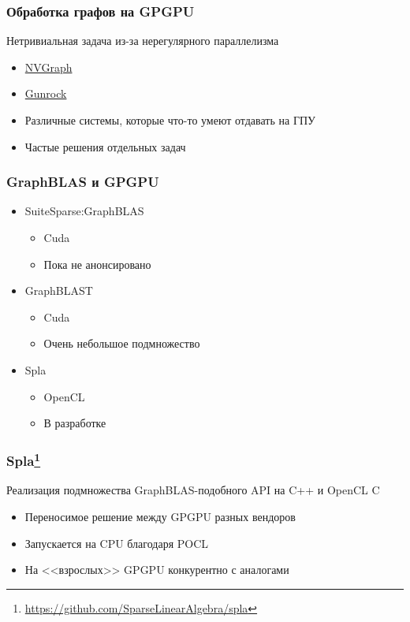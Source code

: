 \documentclass[xcolor=table,aspectratio=169]{beamer}
\begin{document}
\begin{frame}[fragile]
  \frametitle{Обработка графов на GPGPU}
  Нетривиальная задача из-за нерегулярного параллелизма
  \begin{itemize}
    \item \href{https://developer.nvidia.com/nvgraph}{NVGraph}
    \item \href{https://github.com/gunrock/gunrock}{Gunrock}    
    \item Различные системы, которые что-то умеют отдавать на ГПУ
    \item Частые решения отдельных задач
  \end{itemize}

\end{frame}


\begin{frame}[fragile]
  \frametitle{GraphBLAS и GPGPU}
  \begin{itemize}
    \item SuiteSparse:GraphBLAS
    \begin{itemize}
      \item Cuda
      \item Пока не анонсировано
    \end{itemize}
    \item GraphBLAST
    \begin{itemize}
      \item Cuda
      \item Очень небольшое подмножество
    \end{itemize}
    \item Spla
    \begin{itemize}
      \item OpenCL
      \item В разработке
    \end{itemize}
    \end{itemize}
\end{frame}

\begin{frame}[fragile]
  \frametitle{Spla\footnote{\url{https://github.com/SparseLinearAlgebra/spla}}}
  Реализация подмножества GraphBLAS-подобного API на C++ и OpenCL C
  \begin{itemize}
    \item Переносимое решение между GPGPU разных вендоров
    \item Запускается на CPU благодаря POCL
    \item На <<взрослых>> GPGPU конкурентно с аналогами    
  \end{itemize}
\end{frame}
\end{document}
